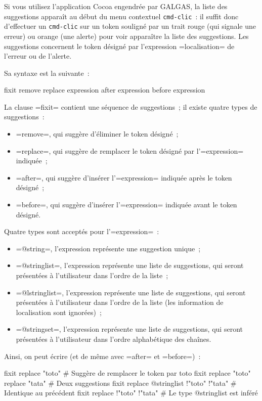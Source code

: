 Si vous utilisez l'application Cocoa engendrée par GALGAS, la liste des suggestions apparaît au début du menu contextuel \texttt{cmd-clic}~: il suffit donc d'effectuer un \texttt{cmd-clic} sur un token souligné par un trait rouge (qui signale une erreur) ou orange (une alerte) pour voir apparaître la liste des suggestions. Les suggestions concernent le token désigné par l'expression \ggsq=localisation= de l'erreur ou de l'alerte.

Sa syntaxe est la suivante~:

\begin{galgas4}
fixit {
  remove
  replace expression
  after expression
  before expression
}
\end{galgas4}

La clause \ggsq=fixit= contient une séquence de suggestions~; il existe quatre types de suggestions~:
\begin{itemize}
\item \ggsq=remove=, qui suggère d'éliminer le token désigné~;
\item \ggsq=replace=, qui suggère de remplacer le token désigné par l'\ggsq=expression= indiquée~;
\item \ggsq=after=, qui suggère d'insérer l'\ggsq=expression= indiquée après le token désigné~;
\item \ggsq=before=, qui suggère d'insérer l'\ggsq=expression= indiquée avant le token désigné.
\end{itemize}

Quatre types sont acceptés pour l'\ggsq=expression=~:
\begin{itemize}
  \item \ggsq=@string=, l'expression représente une suggestion unique~;
  \item \ggsq=@stringlist=, l'expression représente une liste de suggestions, qui seront présentées à l'utilisateur dans l'ordre de la liste~;
  \item \ggsq=@lstringlist=, l'expression représente une liste de suggestions, qui seront présentées à l'utilisateur dans l'ordre de la liste (les information de localisation sont ignorées)~;
  \item \ggsq=@stringset=, l'expression représente une liste de suggestions, qui seront présentées à l'utilisateur dans l'ordre alphabétique des chaînes.
\end{itemize}

Ainsi, on peut écrire (et de même avec \ggsq=after= et \ggsq=before=)~:
\begin{galgas4}
fixit { replace "toto" } # Suggère de remplacer le token par toto
fixit { replace "toto" replace "tata" } # Deux suggestions
fixit { replace @stringlist {!"toto" !"tata"} } # Identique au précédent
fixit { replace {!"toto" !"tata"} } # Le type @stringlist est inféré
\end{galgas4}


